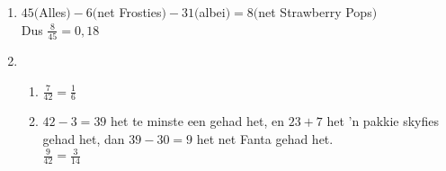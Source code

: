  \begin{eocsolutions}{}{
\begin{enumerate}[itemsep=5pt, label=\textbf{\arabic*}. ] 


\item %

$45($Alles$) - 6($net Frosties$) - 31 ($albei$) = 8 ($net Strawberry Pops$)$\\
Dus $\frac{8}{45}=0,18$

\item %
    \begin{enumerate}[noitemsep, label=\textbf{(\alph*)} ]
    \item $\frac{7}{42} = \frac{1}{6}$

    \item  $42 - 3 = 39$ het te minste een gehad het, en $23 + 7$ het 'n pakkie skyfies gehad het, dan $39 - 30 = 9$ het net Fanta gehad het.\\
    $\frac{9}{42} = \frac{3}{14}$
    \end{enumerate}


\end{enumerate}}
\end{eocsolutions}
